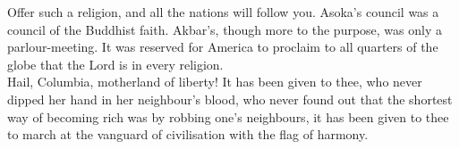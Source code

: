 Offer such a religion, and all the nations will follow you.
Asoka's council was a
council of the Buddhist faith. Akbar's, though more to the purpose, was
only a
parlour-meeting. It was reserved for America to proclaim to all
quarters of the globe
that the Lord is in every religion.\\

Hail, Columbia, motherland of liberty! It has been given to
thee, who never dipped
her hand in her neighbour’s blood, who never found out that the
shortest way of
becoming rich was by robbing one’s neighbours, it has been given to
thee to march
at the vanguard of civilisation with the flag of harmony.\\

